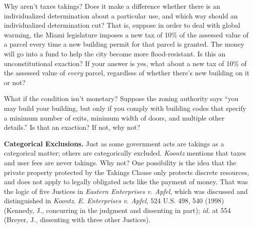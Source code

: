 
\item Why aren't taxes takings? Does it make a difference whether there is an
individualized determination about a particular use, and which way should an
individualized determination cut? That is, suppose in order to deal with global
warming, the Miami legislature imposes a new tax of 10\% of the assessed value
of a parcel every time a new building permit for that parcel is granted. The
money will go into a fund to help the city become more flood-resistant. Is this
an unconstitutional exaction? If your answer is yes, what about a new tax of
10\% of the assessed value of \textit{every} parcel, regardless of whether
there's new building on it or not? 

\item What if the condition isn't monetary? Suppose the zoning authority says
``you may build your building, but only if you comply with building codes that
specify a minimum number of exits, minimum width of doors, and multiple other
details.'' Is that an exaction? If not, why not?

\item \textbf{Categorical Exclusions.} Just as some government acts are takings
as a categorical matter; others are categorically excluded. \textit{Koontz}
mentions that taxes and user fees are never takings. Why not? One possibility is
the idea that the private property protected by the Takings Clause only protects
discrete resources, and does not apply to legally obligated acts like the
payment of money. That was the logic of five Justices in \textit{Eastern
Enterprises v. Apfel}, which was discussed and distinguished in \textit{Koontz}.
\emph{E. Enterprises v. Apfel}, 524 U.S. 498, 540 (1998) (Kennedy, J.,
concurring in the judgment and dissenting in part); \textit{id.} at 554 (Breyer,
J., dissenting with three other Justices). 


